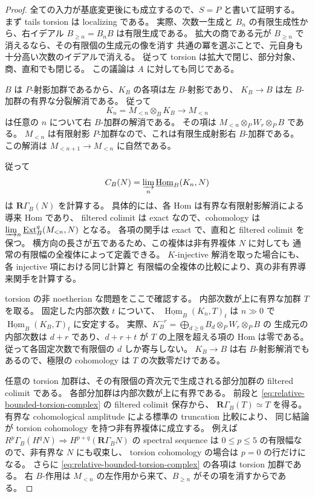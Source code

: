 \begin{proof}
全ての入力が基底変更後にも成立するので、$S=P$ と書いて証明する。
まず tails torsion は localizing である。
実際、次数一生成と $B_n$ の有限生成性から、右イデアル $B_{\geq n}=B_nB$ は有限生成である。
拡大の商である元が $B_{\geq n}$ で消えるなら、その有限個の生成元の像を消す
共通の冪を選ぶことで、元自身も十分高い次数のイデアルで消える。
従って torsion は拡大で閉じ、部分対象、商、直和でも閉じる。
この議論は $A$ に対しても同じである。

$B$ は $P$-射影加群であるから、$K_B$ の各項は左 $B$-射影であり、
$K_B\to B$ は左 $B$-加群の有界な分裂解消である。
従って
\[
 K_n=M_{<n}\otimes_B K_B\longrightarrow M_{<n}
\]
は任意の $n$ について右 $B$-加群の解消である。
その項は $M_{<n}\otimes_PW_r\otimes_PB$ である。
$M_{<n}$ は有限射影 $P$-加群なので、これは有限生成射影右 $B$-加群である。
この解消は $M_{<n+1}\to M_{<n}$ に自然である。

従って
\begin{equation}\label{eq:relative-bounded-torsion-complex}
 C_B(N)=\varinjlim_n
 \underline{\operatorname{Hom}}_B(K_n,N)
\end{equation}
は $\mathbf R\Gamma_B(N)$ を計算する。
具体的には、各 Hom は有界な有限射影解消による導来 Hom であり、
filtered colimit は exact なので、cohomology は
$\varinjlim_n\underline{\operatorname{Ext}}^q_B(M_{<n},N)$ となる。
各項の関手は exact で、直和と filtered colimit を保つ。
横方向の長さが五であるため、この複体は非有界複体 $N$ に対しても
通常の有限幅の全複体によって定義できる。
$K$-injective 解消を取った場合にも、各 injective 項における同じ計算と
有限幅の全複体の比較により、真の非有界導来関手を計算する。

torsion の非 noetherian な問題をここで確認する。
内部次数が上に有界な加群 $T$ を取る。
固定した内部次数 $t$ について、
$\underline{\operatorname{Hom}}_B(K_n,T)_t$ は $n\gg0$ で
$\underline{\operatorname{Hom}}_B(K_B,T)_t$ に安定する。
実際、$K_B^{-r}=\bigoplus_{d\geq0}B_d\otimes_PW_r\otimes_PB$ の
生成元の内部次数は $d+r$ であり、$d+r+t$ が $T$ の上限を超える項の Hom は零である。
従って各固定次数で有限個の $d$ しか寄与しない。
$K_B\to B$ は右 $B$-射影解消でもあるので、極限の cohomology は $T$ の次数零だけである。

任意の torsion 加群は、その有限個の斉次元で生成される部分加群の filtered colimit である。
各部分加群は内部次数が上に有界である。
前段と \eqref{eq:relative-bounded-torsion-complex} の filtered colimit 保存から、
$\mathbf R\Gamma_B(T)\simeq T$ を得る。
有界な cohomological amplitude による標準の truncation 比較により、
同じ結論が torsion cohomology を持つ非有界複体に成立する。
例えば $R^p\Gamma_B(H^qN)\Rightarrow H^{p+q}(\mathbf R\Gamma_BN)$ の
spectral sequence は $0\leq p\leq5$ の有限幅なので、非有界な $N$ にも収束し、
torsion cohomology の場合は $p=0$ の行だけになる。
さらに \eqref{eq:relative-bounded-torsion-complex} の各項は torsion 加群である。
右 $B$-作用は $M_{<n}$ の左作用から来て、$B_{\geq n}$ がその項を消すからである。


\end{proof}
